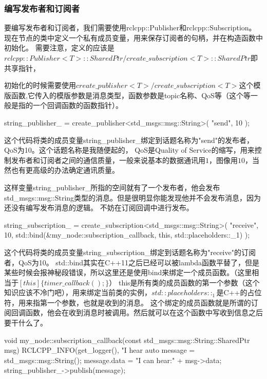\subsubsection{编写发布者和订阅者}
要编写发布者和订阅者，我们需要使用rclcpp::Publisher和rclcpp::Subscription。
现在节点的类中定义一个私有成员变量，用来保存订阅者的句柄，并在构造函数中初始化。
需要注意，定义的应该是$rclcpp::Publisher<T>::SharedPtr/create\_subscription<T>::SharedPtr$即共享指针，

初始化的时候需要使用$create\_publisher<T>/create\_subscription<T>$这个模版函数,它传入的模版参数是消息类型，函数参数是topic名称、QoS等（这个等一般是指的一个回调函数的函数指针）。


\begin{tcode}
    string_publisher_ = create_publisher<std_msgs::msg::String>(
         "send",
         10
         );
\end{tcode}
这个代码将类的成员变量string\_publisher\_绑定到话题名称为"send"的发布者，QoS为10。这个话题名称是我随便起的，
QoS是Quality of Service的缩写，用来控制发布者和订阅者之间的通信质量，一般来说基本的数据通讯用$1$，图像用$10$，当然也有更高级的办法确定通讯质量。

这样变量string\_publisher\_所指的空间就有了一个发布者，他会发布std\_msgs::msg::String类型的消息。但是很明显你能发现他并不会发布消息，因为还没有编写发布消息的逻辑。
不妨在订阅回调中进行发布。

\begin{tcode}
    string_subscription_ = create_subscription<std_msgs::msg::String>(
         "receive",
         10,
         std::bind(&my_node::subscription_callback, this, std::placeholders::_1)
         );
\end{tcode}
这个代码将类的成员变量string\_subscription\_绑定到话题名称为"receive"的订阅者，QoS为10。
std::bind其实在C++11之后已经可以被lambda函数平替了，但是某些时候会报神秘段错误，所以这里还是使用bind来绑定一个成员函数。（这里相当于$[this] \{ timer\_callback(); \}$）
this是所有类的成员函数的第一个参数（这个知识应该不冷门吧），用来绑定当前类的实例，$std::placeholders::_1$是C++的占位符，用来指第一个参数，也就是收到的消息。
这个绑定的成员函数就是所谓的订阅回调函数，他会在收到消息时被调用。然后就可以在这个函数中写收到信息之后要干什么了。
\begin{tcode}
void my_node::subscription_callback(const std_msgs::msg::String::SharedPtr msg)
{
 RCLCPP_INFO(get_logger(), "I hear %
 auto message = std_msgs::msg::String();
 message.data = "I can hear:" + msg->data;
 string_publisher_->publish(message);
}
\end{tcode}

